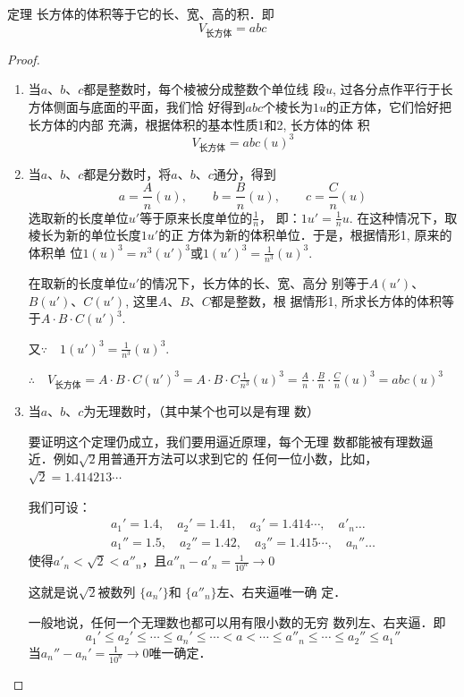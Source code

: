 \begin{blk}
   {定理} 长方体的体积等于它的长、宽、高的积．即
\[V_{\text{长方体}}=abc\] 
\end{blk}

\begin{proof}
\begin{enumerate}
    \item 当$a$、$b$、$c$都是整数时，每个棱被分成整数个单位线
段$u$, 过各分点作平行于长方体侧面与底面的平面，我们恰
好得到$abc$个棱长为$1u$的正方体，它们恰好把长方体的内部
充满，根据体积的基本性质1和2, 长方体的体
积
\[V_{\text{长方体}}=abc(u)^3\]
\item 当$a$、$b$、$c$都是分数时，将$a$、$b$、$c$通分，得到
\[a=\frac{A}{n}(u),\qquad b=\frac{B}{n}(u),\qquad c=\frac{C}{n}(u)\]
选取新的长度单位$u'$等于原来长度单位的$\frac{1}{n}$，
即：$1u'=\frac{1}{n}u$. 
在这种情况下，取棱长为新的单位长度$1u'$的正
方体为新的体积单位．于是，根据情形1, 原来的体积单
位$1(u)^3=n^3(u')^3$或$1(u')^3=\frac{1}{n^3}(u)^3$.

在取新的长度单位$u'$的情况下，长方体的长、宽、高分
别等于$A(u')$、$B(u')$、$C(u')$, 这里$A$、$B$、$C$都是整数，根
据情形1, 所求长方体的体积等于$A\cdot B\cdot C(u')^3$. 

又$\because\quad 1(u')^3=\frac{1}{n^3}(u)^3$. 

$\therefore\quad V_{\text{长方体}}=A\cdot B\cdot C(u')^3
=A\cdot B\cdot C\frac{1}{n^3}(u)^3=\frac{A}{n}\cdot \frac{B}{n}\cdot 
\frac{C}{n}(u)^3=abc(u)^3$

\item 当$a$、$b$、$c$为无理数时，（其中某个也可以是有理
数）

要证明这个定理仍成立，我们要用逼近原理，每个无理
数都能被有理数逼近．例如$\sqrt{2}$用普通开方法可以求到它的
任何一位小数，比如，
$\sqrt{2}=1.414213\cdots$

我们可设：
\[\begin{split}
    a_1'=1.4,\quad a_2'=1.41,\quad a_3'=1.414\cdots,\quad a'_n\ldots\\
a_1''=1.5,\quad a_2''=1.42,\quad a_3''=1.415\cdots,\quad a_n''\ldots
\end{split}\]
使得$a'_n<\sqrt{2}<a''_n$，且$a''_n-a'_n=\frac{1}{10^n}\to 0$

这就是说$\sqrt{2}$被数列 $\{a_n'\}$和 $\{a''_n\}$左、右夹逼唯一确
定．

一般地说，任何一个无理数也都可以用有限小数的无穷
数列左、右夹逼．即
\[a_1'\le a_2'\le \cdots\le a_n'\le \cdots<a<\cdots\le a''_n\le \cdots\le a_2''\le a_1''\]
当$a_n''-a_n'=\frac{1}{10^n}\to 0$唯一确定．


\end{enumerate}
\end{proof}
